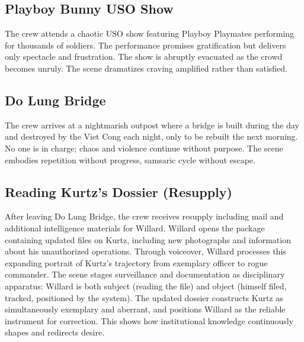 \begin{minipage}{\textwidth}
	\subsection*{Playboy Bunny USO Show}
	\label{scene:playboy-show}

	The crew attends a chaotic USO show featuring Playboy Playmates performing for thousands of
	soldiers. The performance promises gratification but delivers only spectacle and frustration.
	The show is abruptly evacuated as the crowd becomes unruly. The scene dramatizes craving
	amplified rather than satisfied.
\end{minipage}

\begin{minipage}{\textwidth}
	\subsection*{Do Lung Bridge}
	\label{scene:do-lung-bridge}

	The crew arrives at a nightmarish outpost where a bridge is built during the day and destroyed
	by the Viet Cong each night, only to be rebuilt the next morning. No one is in charge; chaos
	and violence continue without purpose. The scene embodies repetition without progress, samsaric
	cycle without escape.
\end{minipage}

\begin{minipage}{\textwidth}
	\subsection*{Reading Kurtz's Dossier (Resupply)}
	\label{scene:dossier-reading}

	After leaving Do Lung Bridge, the crew receives resupply including mail and additional
	intelligence materials for Willard. Willard opens the package containing updated files on Kurtz,
	including new photographs and information about his unauthorized operations. Through voiceover,
	Willard processes this expanding portrait of Kurtz's trajectory from exemplary officer to rogue
	commander. The scene stages surveillance and documentation as disciplinary apparatus: Willard is
	both subject (reading the file) and object (himself filed, tracked, positioned by the system).
	The updated dossier constructs Kurtz as simultaneously exemplary and aberrant, and positions
	Willard as the reliable instrument for correction. This shows how institutional knowledge
	continuously shapes and redirects desire.
\end{minipage}

